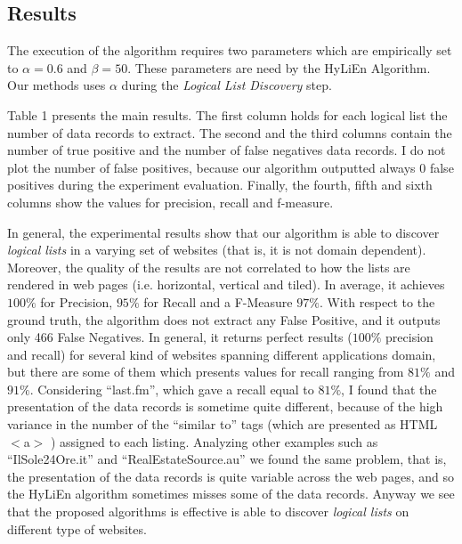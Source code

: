 \subsection{Results}
The execution of the algorithm requires two parameters which are empirically set to $\alpha=0.6$ and $\beta=50$. These parameters are need by the HyLiEn Algorithm. Our methods uses $\alpha$ during the \emph{Logical List Discovery} step.

Table 1 presents the main results. The first column holds for each logical list the number of data records to extract. The second and the third columns contain the number of true positive and the number of false negatives data records. I do not plot the number of false positives, because our algorithm outputted always 0 false positives during the experiment evaluation. Finally, the fourth, fifth and sixth columns show the values for precision, recall and f-measure.

In general, the experimental results show that our algorithm is able to discover \textit{logical lists} in a varying set of websites (that is, it is not domain dependent). Moreover, the quality of the results are not correlated to how the lists are rendered in web pages (i.e. horizontal, vertical and tiled). In average, it achieves $100\%$ for Precision, $95\%$ for Recall and a F-Measure $97\%$. With respect to the ground truth, the algorithm does not extract any False Positive, and it outputs only 466 False Negatives. 
In general, it returns perfect results ($100\%$ precision and recall) for several kind of websites spanning different applications domain, but there are some of them which presents values for recall ranging from $81\%$ and $91\%$. Considering ``last.fm'', which gave a recall equal to $81\%$, I found that the presentation of the data records is sometime quite different, because of the high variance in the number of the ``similar to'' tags (which are presented as HTML $<$a$>$ ) assigned to each listing. Analyzing other examples such as ``IlSole24Ore.it'' and ``RealEstateSource.au'' we found the same problem, that is, the presentation of the data records is quite variable across the web pages, and so the HyLiEn algorithm sometimes misses some of the data records. Anyway we see that the proposed algorithms is effective is able to discover \emph{logical lists} on different type of websites.

